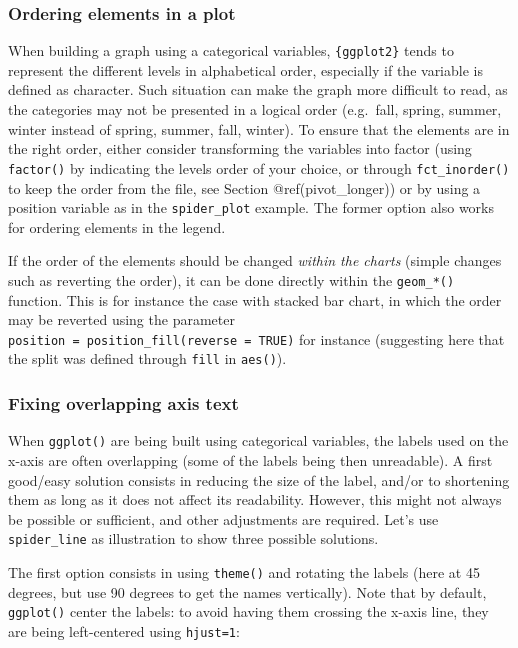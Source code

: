 \documentclass[
]{krantz}
\begin{document}
\hypertarget{ordering-elements-in-a-plot}{%
\subsubsection{Ordering elements in a plot}\label{ordering-elements-in-a-plot}}

When building a graph using a categorical variables, \texttt{\{ggplot2\}} tends to represent the different levels in alphabetical order, especially if the variable is defined as character. Such situation can make the graph more difficult to read, as the categories may not be presented in a logical order (e.g.~fall, spring, summer, winter instead of spring, summer, fall, winter). To ensure that the elements are in the right order, either consider transforming the variables into factor (using \texttt{factor()} by indicating the levels order of your choice, or through \texttt{fct\_inorder()} to keep the order from the file, see Section @ref(pivot\_longer)) or by using a position variable as in the \texttt{spider\_plot} example. The former option also works for ordering elements in the legend.

If the order of the elements should be changed \emph{within the charts} (simple changes such as reverting the order), it can be done directly within the \texttt{geom\_*()} function. This is for instance the case with stacked bar chart, in which the order may be reverted using the parameter \texttt{position\ =\ position\_fill(reverse\ =\ TRUE)} for instance (suggesting here that the split was defined through \texttt{fill} in \texttt{aes()}).

\hypertarget{fixing-overlapping-axis-text}{%
\subsubsection{Fixing overlapping axis text}\label{fixing-overlapping-axis-text}}

When \texttt{ggplot()} are being built using categorical variables, the labels used on the x-axis are often overlapping (some of the labels being then unreadable). A first good/easy solution consists in reducing the size of the label, and/or to shortening them as long as it does not affect its readability. However, this might not always be possible or sufficient, and other adjustments are required. Let's use \texttt{spider\_line} as illustration to show three possible solutions.

The first option consists in using \texttt{theme()} and rotating the labels (here at 45 degrees, but use 90 degrees to get the names vertically). Note that by default, \texttt{ggplot()} center the labels: to avoid having them crossing the x-axis line, they are being left-centered using \texttt{hjust=1}:
\end{document}
